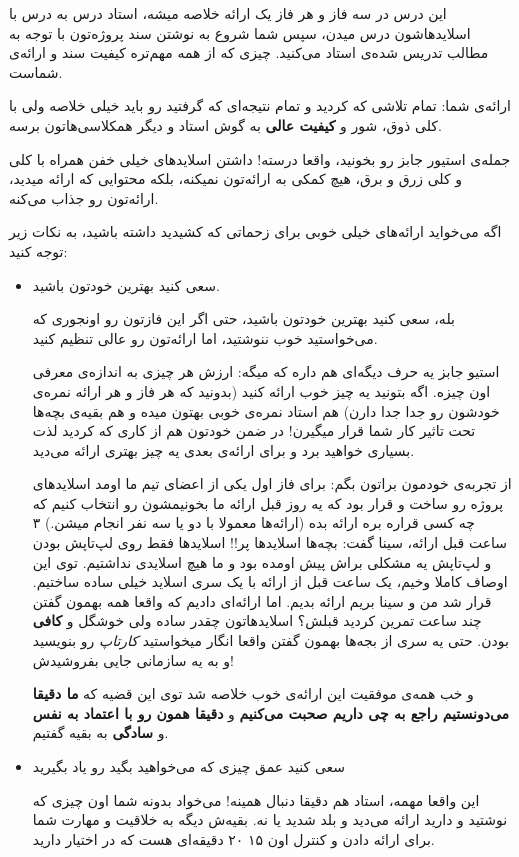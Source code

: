 این درس در سه فاز و هر فاز یک ارائه خلاصه میشه، استاد درس به درس با اسلاید‌هاشون درس میدن، سپس شما شروع به نوشتن سند پروژه‌تون با توجه به مطالب تدریس شده‌ی استاد می‌کنید. چیزی که از همه مهم‌تره کیفیت سند و ارائه‌ی شماست.

ارائه‌ی شما: تمام تلاشی که کردید و تمام نتیجه‌ای که گرفتید رو باید خیلی خلاصه ولی با کلی ذوق، شور و \textbf{کیفیت عالی} به گوش استاد و دیگر همکلاسی‌هاتون برسه.

جمله‌ی استیور جابز رو بخونید، واقعا درسته! داشتن اسلاید‌های خیلی خفن همراه با کلی  و کلی زرق و برق، هیچ کمکی به ارائه‌تون نمیکنه، بلکه محتوایی که ارائه میدید، ارائه‌تون رو جذاب می‌کنه.

اگه می‌خواید ارائه‌های خیلی خوبی برای زحماتی که کشیدید داشته باشید، به نکات زیر توجه کنید:
\begin{itemize}
	\item 
	{\large سعی کنید بهترین خودتون باشید.}
	
	بله، سعی کنید بهترین خودتون باشید، حتی اگر این فازتون رو اونجوری که می‌خواستید خوب ننوشتید،  اما ارائه‌تون رو عالی تنظیم کنید.
	
	استیو جابز یه حرف دیگه‌ای هم داره که میگه: ارزش هر چیزی به اندازه‌ی معرفی اون چیزه. اگه بتونید یه چیز خوب ارائه کنید (بدونید که هر فاز و هر ارائه نمره‌ی خودشون رو جدا جدا دارن) هم استاد نمره‌ی خوبی بهتون میده و هم بقیه‌ی بچه‌ها تحت تاثیر کار شما قرار میگیرن! در ضمن خودتون هم از کاری که کردید لذت بسیاری خواهید برد و برای ارائه‌ی بعدی یه چیز بهتری ارائه می‌دید.
	
	از تجربه‌ی خودمون براتون بگم: برای فاز اول یکی از اعضای تیم ما اومد اسلاید‌های پروژه رو ساخت و قرار بود که یه روز قبل ارائه ما بخونیمشون رو انتخاب کنیم که چه کسی قراره بره ارائه بده (ارائه‌‌ها معمولا با دو یا سه نفر انجام میشن.) ۳ ساعت قبل ارائه، سینا گفت: بچه‌ها اسلاید‌ها پر!! اسلاید‌ها فقط روی لپ‌تاپش بودن و لپ‌تاپش یه مشکلی براش پیش اومده بود و ما هیچ اسلایدی نداشتیم.
	توی این اوصاف کاملا وخیم، یک ساعت قبل از ارائه با 
	یک سری اسلاید خیلی ساده ساختیم.
	قرار شد من و سینا بریم ارائه بدیم. اما ارائه‌ای دادیم که واقعا همه بهمون گفتن چند ساعت تمرین کردید قبلش؟ اسلاید‌هاتون چقدر ساده ولی خوشگل و \textbf{کافی} بودن.
	حتی یه سری از بجه‌ها بهمون گفتن واقعا انگار میخواستید \textit{کارتاپ} رو بنویسید و به یه سازمانی جایی بفروشیدش!
	
	و خب همه‌ی موفقیت این ارائه‌ی خوب خلاصه شد توی این قضیه که \textbf{ما دقیقا می‌دونستیم راجع به چی داریم صحبت می‌کنیم} و \textbf{دقیقا همون رو با اعتماد به نفس} و \textbf{سادگی} به بقیه گفتیم.
	
	\item 
	{\large سعی کنید عمق چیزی که می‌خواهید بگید رو یاد بگیرید}
	
	این واقعا مهمه، استاد هم دقیقا دنبال همینه! می‌خواد بدونه شما اون چیزی که نوشتید و دارید ارائه می‌دید و بلد شدید یا نه. بقیه‌ش دیگه به خلاقیت و مهارت شما برای ارائه دادن و کنترل اون ۱۵ ۲۰ دقیقه‌ای هست که در اختیار دارید.
	
\end{itemize}

